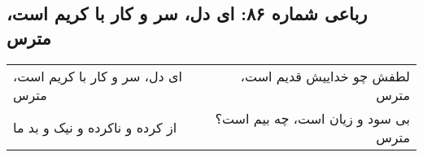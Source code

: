 \begin{center}
\section*{رباعی شماره ۸۶: ای دل، سر و کار با کریم است، مترس}
\label{sec:086}
\begin{longtable}{l p{0.5cm} r}
ای دل، سر و کار با کریم است، مترس
&&
لطفش چو خداییش قدیم است، مترس
\\
از کرده و ناکرده و نیک و بد ما
&&
بی سود و زیان است، چه بیم است؟ مترس
\\
\end{longtable}
\end{center}
